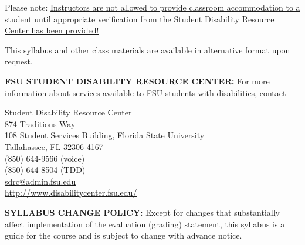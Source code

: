 \documentclass[12pt,oneside]{amsart}
\begin{document}
Please note: \ul{Instructors are not allowed to provide classroom accommodation to a student until appropriate verification from the Student Disability Resource Center has been provided!}

\noindent This syllabus and other class materials are available in alternative format upon request.

\newpage

\noindent \textbf{FSU STUDENT DISABILITY RESOURCE CENTER:} For more information about services available to FSU students with disabilities, contact

{\centering
 Student Disability Resource Center
\\
874 Traditions Way
\\
108 Student Services Building, 
Florida State University
\\
Tallahassee, FL 32306-4167
\\
(850) 644-9566 (voice)
\\
(850) 644-8504 (TDD)
\\
\url{sdrc@admin.fsu.edu}
\\
\url{http://www.disabilitycenter.fsu.edu/}
\\
}

\vspace{12pt}

\noindent \textbf{SYLLABUS CHANGE POLICY:}
Except for changes that substantially affect implementation of the evaluation (grading) statement, this syllabus is a guide for the course and is subject to change with advance notice.
\end{document}
